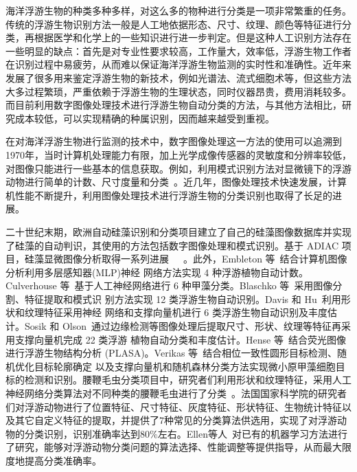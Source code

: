 海洋浮游生物的种类多种多样，对这么多的物种进行分类是一项非常繁重的任务。传统的浮游生物识别方法一般是人工地依据形态、尺寸、纹理、颜色等特征进行分类，再根据医学和化学上的一些知识进行进一步判定。但是这种人工识别方法存在一些明显的缺点：首先是对专业性要求较高，工作量大，效率低，浮游生物工作者在识别过程中易疲劳，从而难以保证海洋浮游生物监测的实时性和准确性。近年来发展了很多用来鉴定浮游生物的新技术，例如光谱法、流式细胞术等，但这些方法大多过程繁琐，严重依赖于浮游生物的生理状态，同时仪器昂贵，费用消耗较多。而目前利用数字图像处理技术进行浮游生物自动分类的方法，与其他方法相比，研究成本较低，可以实现精确的种属识别，因而越来越受到重视。

在对海洋浮游生物进行监测的技术中，数字图像处理这一方法的使用可以追溯到1970年，当时计算机处理能力有限，加上光学成像传感器的灵敏度和分辨率较低，对图像只能进行一些基本的信息获取。例如，利用模式识别方法对显微镜下的浮游动物进行简单的计数、尺寸度量和分类~\cite{jeffries1984automated}。近几年，图像处理技术快速发展，计算机性能不断提升，利用图像处理技术进行浮游生物的分类识别也取得了长足的进展。

二十世纪末期，欧洲自动硅藻识别和分类项目建立了自己的硅藻图像数据库并实现了硅藻的自动判识，其使用的方法包括数字图像处理和模式识别。基于 ADIAC 项目，硅藻显微图像分析取得一系列进展~\cite{hicks2006model}~\cite{dimitrovski2012hierarchical}~\cite{wilkinsondiatom}。此外，Embleton 等~\cite{embleton2003automated}结合计算机图像分析利用多层感知器(MLP)神经 网络方法实现 4 种浮游植物自动计数。Culverhouse 等~\cite{culverhouse2003experts}基于人工神经网络进行 6 种甲藻分类。Blaschko 等~\cite{blaschko2005automatic}采用图像分割、特征提取和模式识 别方法实现 12 类浮游生物自动识别。Davis 和 Hu~\cite{hu2006accurate}利用形状和纹理特征采用神经 网络和支撑向量机进行 6 类浮游生物自动识别及丰度估计。Sosik 和 Olson~\cite{sosik2007automated}通过边缘检测等图像处理后提取尺寸、形状、纹理等特征再采用支撑向量机完成 22 类浮游 植物自动分类和丰度估计。Hense 等~\cite{hense2008use}结合荧光图像进行浮游生物结构分析 (PLASA)。Verikas 等~\cite{verikas2012phase}结合相位一致性圆形目标检测、随机优化目标轮廓确定 以及支撑向量机和随机森林分类方法实现微小原甲藻细胞目标的检测和识别。腰鞭毛虫分类项目中，研究者们利用形状和纹理特征，采用人工神经网络分类算法对不同种类的腰鞭毛虫进行了分类~\cite{culverhouse2003expert}。法国国家科学院的研究者们对浮游动物进行了位置特征、尺寸特征、灰度特征、形状特征、生物统计特征以及其它自定义特征的提取，并提供了7种常见的分类算法供选用，实现了对浮游动物的分类识别，识别准确率达到80\%左右。Ellen等人~\cite{Quantifying2015Ellen}对已有的机器学习方法进行了研究，能够对浮游动物分类问题的算法选择、性能调整等提供指导，从而最大限度地提高分类准确率。

